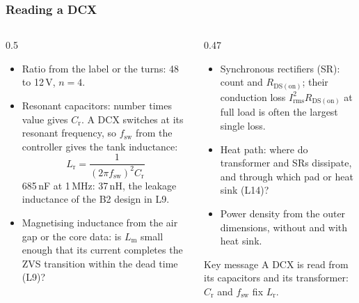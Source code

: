 \begin{frame}
	\frametitle{Reading a DCX}
	\begin{columns}[T]
		\begin{column}{0.5\textwidth}
			\footnotesize
			\begin{itemize}
				\item Ratio from the label or the turns: 48 to 12\,V, $n=4$.
				\item Resonant capacitors: number times value gives $C_\mathrm{r}$. A DCX switches at its resonant frequency, so $f_\mathrm{sw}$ from the controller gives the tank inductance:
				\begin{equation*}
					L_\mathrm{r}=\frac{1}{(2\pi f_\mathrm{sw})^2C_\mathrm{r}}
				\end{equation*}
				685\,nF at 1\,MHz: 37\,nH, the leakage inductance of the B2 design in L9.
				\item Magnetising inductance from the air gap or the core data: is $L_\mathrm{m}$ small enough that its current completes the ZVS transition within the dead time (L9)?
			\end{itemize}
		\end{column}
		\begin{column}{0.47\textwidth}
			\footnotesize
			\begin{itemize}
				\item Synchronous rectifiers (SR): count and $R_\mathrm{DS(on)}$; their conduction loss $I_\mathrm{rms}^2R_\mathrm{DS(on)}$ at full load is often the largest single loss.
				\item Heat path: where do transformer and SRs dissipate, and through which pad or heat sink (L14)?
				\item Power density from the outer dimensions, without and with heat sink.
			\end{itemize}
			\begin{block}{Key message}
				A DCX is read from its capacitors and its transformer: $C_\mathrm{r}$ and $f_\mathrm{sw}$ fix $L_\mathrm{r}$.
			\end{block}
		\end{column}
	\end{columns}
\end{frame}

